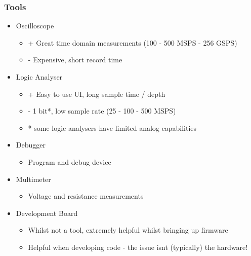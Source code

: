 \documentclass[t]{beamer}
\begin{document}

\begin{frame}[t]
\frametitle{Tools}
\begin{itemize}
	\item Oscilloscope
	\begin{itemize}
		\item + Great time domain measurements (100 - 500 MSPS - 256 GSPS)
		\item - Expensive, short record time
	\end{itemize} 	
	\item Logic Analyser
	\begin{itemize}
		\item + Easy to use UI, long sample time / depth
		\item - 1 bit*, low sample rate (25 - 100 - 500 MSPS)
		\item * some logic analysers have limited analog capabilities 
	\end{itemize} 
	\item Debugger
	\begin{itemize}
		\item Program and debug device
	\end{itemize} 
	\item Multimeter
	\begin{itemize}
		\item Voltage and resistance measurements
	\end{itemize} 
	\item Development Board
	\begin{itemize}
		\item Whilst not a tool, extremely helpful whilst bringing up firmware
		\item Helpful when developing code - the issue isnt (typically) the hardware!
	\end{itemize} 
\end{itemize} 
\end{frame}

\end{document}
